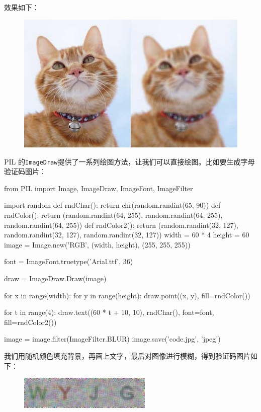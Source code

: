 效果如下：

 
 \begin{figure}[htp]
	\centering
	\includegraphics[width=0.6\linewidth]{fig/966760155050624.png}
\end{figure}


PIL
的\texttt{ImageDraw}提供了一系列绘图方法，让我们可以直接绘图。比如要生成字母验证码图片：

\begin{pythoncode}
from PIL import Image, ImageDraw, ImageFont, ImageFilter

import random
def rndChar():
    return chr(random.randint(65, 90))
def rndColor():
    return (random.randint(64, 255), random.randint(64, 255), random.randint(64, 255))
def rndColor2():
    return (random.randint(32, 127), random.randint(32, 127), random.randint(32, 127))
width = 60 * 4
height = 60
image = Image.new('RGB', (width, height), (255, 255, 255))

font = ImageFont.truetype('Arial.ttf', 36)

draw = ImageDraw.Draw(image)

for x in range(width):
    for y in range(height):
        draw.point((x, y), fill=rndColor())

for t in range(4):
    draw.text((60 * t + 10, 10), rndChar(), font=font, fill=rndColor2())

image = image.filter(ImageFilter.BLUR)
image.save('code.jpg', 'jpeg')
\end{pythoncode}

我们用随机颜色填充背景，再画上文字，最后对图像进行模糊，得到验证码图片如下：

 
 \begin{figure}[htp]
	\centering
	\includegraphics[width=0.6\linewidth]{fig/966760380198752.png}
\end{figure}


